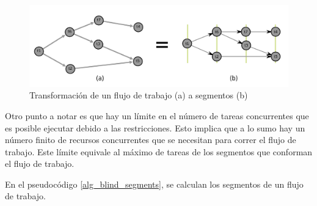 \begin{figure}
\begin{center}
\includegraphics[width=1.0\textwidth]{imagenes/DAG_to_segment.pdf}
\end{center}
\caption{Transformación de un flujo de trabajo (a) a segmentos (b)}
\label{fig:DAG_to_segment}
\end{figure}

Otro punto a notar es que hay un límite en el número de tareas concurrentes que es posible ejecutar debido a las restricciones. Esto implica que a lo sumo hay un número finito de recursos concurrentes que se necesitan para correr el flujo de trabajo. Este límite equivale al máximo de tareas de los segmentos que conforman el flujo de trabajo.

En el pseudocódigo \ref{alg_blind_segments}, se calculan los segmentos de un flujo de trabajo.

